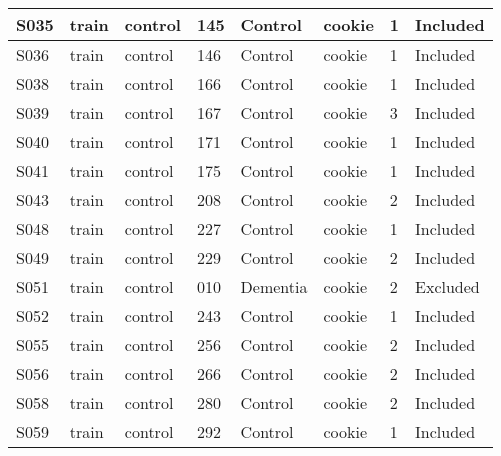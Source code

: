 \begin{center}
\begin{longtable}{|l|l|l|l|l|l|l|l|}
S035           & train                 & control           & 145     & Control        & cookie          & 1            & Included      \\ \hline
S036           & train                 & control           & 146     & Control        & cookie          & 1            & Included      \\ \hline
S038           & train                 & control           & 166     & Control        & cookie          & 1            & Included      \\ \hline
S039           & train                 & control           & 167     & Control        & cookie          & 3            & Included      \\ \hline
S040           & train                 & control           & 171     & Control        & cookie          & 1            & Included      \\ \hline
S041           & train                 & control           & 175     & Control        & cookie          & 1            & Included      \\ \hline
S043           & train                 & control           & 208     & Control        & cookie          & 2            & Included      \\ \hline
S048           & train                 & control           & 227     & Control        & cookie          & 1            & Included      \\ \hline
S049           & train                 & control           & 229     & Control        & cookie          & 2            & Included      \\ \hline
S051           & train                 & control           & 010     & Dementia       & cookie          & 2            & Excluded      \\ \hline
S052           & train                 & control           & 243     & Control        & cookie          & 1            & Included      \\ \hline
S055           & train                 & control           & 256     & Control        & cookie          & 2            & Included      \\ \hline
S056           & train                 & control           & 266     & Control        & cookie          & 2            & Included      \\ \hline
S058           & train                 & control           & 280     & Control        & cookie          & 2            & Included      \\ \hline
S059           & train                 & control           & 292     & Control        & cookie          & 1            & Included      \\ \hline

\end{longtable}
\end{center}
